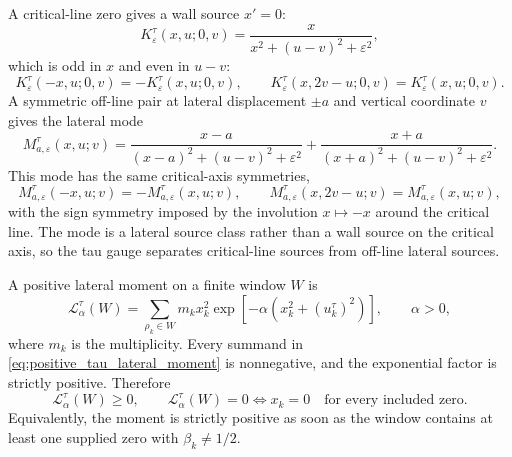 \documentclass[12pt]{article}
\numberwithin{equation}{section}
\begin{document}
\noindent A critical-line zero gives a wall source \(x'=0\):
\begin{equation}
K_{\varepsilon}^{\tau}(x,u;0,v)
=
\frac{x}{x^2+(u-v)^2+\varepsilon^2},
\label{eq:critical_wall_source}
\end{equation}
which is odd in \(x\) and even in \(u-v\):
\begin{equation}
K_{\varepsilon}^{\tau}(-x,u;0,v)=-K_{\varepsilon}^{\tau}(x,u;0,v),
\qquad
K_{\varepsilon}^{\tau}(x,2v-u;0,v)=K_{\varepsilon}^{\tau}(x,u;0,v).
\label{eq:critical_wall_source_symmetry}
\end{equation}
A symmetric off-line pair at lateral displacement \(\pm a\) and vertical coordinate \(v\) gives the lateral mode
\begin{equation}
M_{a,\varepsilon}^{\tau}(x,u;v)
=
\frac{x-a}{(x-a)^2+(u-v)^2+\varepsilon^2}
+
\frac{x+a}{(x+a)^2+(u-v)^2+\varepsilon^2}.
\label{eq:off_line_lateral_mode}
\end{equation}
This mode has the same critical-axis symmetries,
\begin{equation}
M_{a,\varepsilon}^{\tau}(-x,u;v)=-M_{a,\varepsilon}^{\tau}(x,u;v),
\qquad
M_{a,\varepsilon}^{\tau}(x,2v-u;v)=M_{a,\varepsilon}^{\tau}(x,u;v),
\label{eq:off_line_lateral_mode_symmetry}
\end{equation}
with the sign symmetry imposed by the involution \(x\mapsto -x\) around the critical line.  The mode is a lateral source class rather than a wall source on the critical axis, so the tau gauge separates critical-line sources from off-line lateral sources.

\noindent A positive lateral moment on a finite window \(W\) is
\begin{equation}
\mathcal L_{\alpha}^{\tau}(W)
=
\sum_{\rho_k\in W}
m_k x_k^2
\exp\left[-\alpha\left(x_k^2+(u_k^{\tau})^2\right)\right],
\qquad \alpha>0,
\label{eq:positive_tau_lateral_moment}
\end{equation}
where \(m_k\) is the multiplicity.  Every summand in \eqref{eq:positive_tau_lateral_moment} is nonnegative, and the exponential factor is strictly positive.  Therefore
\begin{equation}
\mathcal L_{\alpha}^{\tau}(W)\geq0,
\qquad
\mathcal L_{\alpha}^{\tau}(W)=0
\Longleftrightarrow
x_k=0
\quad\text{for every included zero}.
\label{eq:positive_tau_lateral_moment_zero_criterion}
\end{equation}
Equivalently, the moment is strictly positive as soon as the window contains at least one supplied zero with \(\beta_k\neq1/2\).
\end{document}
